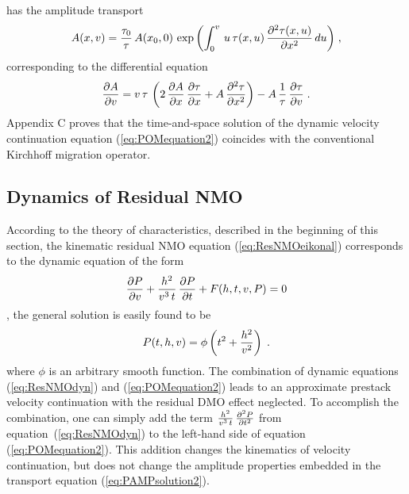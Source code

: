 has the amplitude transport
\begin{equation}
A(x,v) = {\tau_0 \over \tau}\,A(x_0,0)\,
\exp{\left(\int_0^{v}\,u\,\tau(x,u)\,
{\partial^2 \tau(x,u) \over \partial x^2}\,du\right)}\;,
\label{eq:PAMPsolution2} 
\end{equation}
corresponding to the differential equation
\begin{equation}
{\partial A \over \partial v} = v\,\tau\,\left(2\,
{\partial A \over \partial x}\,
{\partial \tau \over \partial x} + A\,
{\partial^2 \tau \over \partial x^2}\right) - 
A\,{1 \over \tau}\,{\partial \tau \over \partial v}\;.
\label{eq:PAMPequation2} 
\end{equation}
Appendix C proves that the time-and-space solution of the dynamic
velocity continuation equation (\ref{eq:POMequation2}) coincides with the
conventional Kirchhoff migration operator.

\begin{comment}
The finite-difference implementation of zero-offset velocity
continuation resembles the implementation of Claerbout's
15-degree equation in a retarded coordinate system
\cite[]{Claerbout.blackwell.76}. This implementation is discussed in
more detail in Appendix C. 
\end{comment}

\subsection{Dynamics of Residual NMO}
According to the theory of characteristics, described in the beginning
of this section, the kinematic residual NMO equation
(\ref{eq:ResNMOeikonal}) corresponds to the dynamic equation of the form
\begin{equation}
{{\partial P} \over {\partial v}} + 
{{h^2} \over {v^3\,t}}\,{{\partial P} \over {\partial t}} 
+ F(h,t,v,P) = 0
\label{eq:ResNMOdyn} 
\end{equation}
, the 
general solution
is easily found to be
\begin{equation}
P(t,h,v) = \phi\left(t^2 + {h^2 \over v^2}\right)\;.
\label{eq:ResNMOsol} 
\end{equation}
where $\phi$ is an arbitrary smooth function.
The combination of dynamic equations (\ref{eq:ResNMOdyn}) and
(\ref{eq:POMequation2}) leads to an approximate prestack velocity
continuation with the residual DMO effect neglected. To accomplish the
combination, one can simply add the term ${{h^2} \over
{v^3\,t}}\,{{\partial^2 P} \over {\partial t^2}}$ from
equation~(\ref{eq:ResNMOdyn}) to the left-hand
side of equation (\ref{eq:POMequation2}). This addition changes the
kinematics of velocity continuation, but does not change the amplitude
properties embedded in the transport equation (\ref{eq:PAMPsolution2}).

